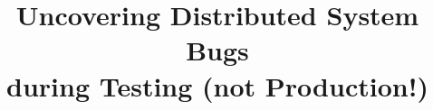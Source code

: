 \documentclass{sig-alternate}
\begin{document}
%

\title{Uncovering Distributed System Bugs\\ during Testing (not Production!)}
%
%
%
%
%
\end{document}
